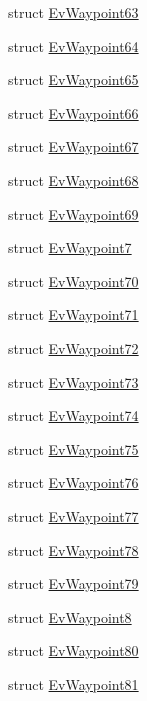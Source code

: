 \begin{DoxyCompactItemize}
\item 
struct \hyperlink{structcl__move__base__z_1_1EvWaypoint63}{Ev\+Waypoint63}
\item 
struct \hyperlink{structcl__move__base__z_1_1EvWaypoint64}{Ev\+Waypoint64}
\item 
struct \hyperlink{structcl__move__base__z_1_1EvWaypoint65}{Ev\+Waypoint65}
\item 
struct \hyperlink{structcl__move__base__z_1_1EvWaypoint66}{Ev\+Waypoint66}
\item 
struct \hyperlink{structcl__move__base__z_1_1EvWaypoint67}{Ev\+Waypoint67}
\item 
struct \hyperlink{structcl__move__base__z_1_1EvWaypoint68}{Ev\+Waypoint68}
\item 
struct \hyperlink{structcl__move__base__z_1_1EvWaypoint69}{Ev\+Waypoint69}
\item 
struct \hyperlink{structcl__move__base__z_1_1EvWaypoint7}{Ev\+Waypoint7}
\item 
struct \hyperlink{structcl__move__base__z_1_1EvWaypoint70}{Ev\+Waypoint70}
\item 
struct \hyperlink{structcl__move__base__z_1_1EvWaypoint71}{Ev\+Waypoint71}
\item 
struct \hyperlink{structcl__move__base__z_1_1EvWaypoint72}{Ev\+Waypoint72}
\item 
struct \hyperlink{structcl__move__base__z_1_1EvWaypoint73}{Ev\+Waypoint73}
\item 
struct \hyperlink{structcl__move__base__z_1_1EvWaypoint74}{Ev\+Waypoint74}
\item 
struct \hyperlink{structcl__move__base__z_1_1EvWaypoint75}{Ev\+Waypoint75}
\item 
struct \hyperlink{structcl__move__base__z_1_1EvWaypoint76}{Ev\+Waypoint76}
\item 
struct \hyperlink{structcl__move__base__z_1_1EvWaypoint77}{Ev\+Waypoint77}
\item 
struct \hyperlink{structcl__move__base__z_1_1EvWaypoint78}{Ev\+Waypoint78}
\item 
struct \hyperlink{structcl__move__base__z_1_1EvWaypoint79}{Ev\+Waypoint79}
\item 
struct \hyperlink{structcl__move__base__z_1_1EvWaypoint8}{Ev\+Waypoint8}
\item 
struct \hyperlink{structcl__move__base__z_1_1EvWaypoint80}{Ev\+Waypoint80}
\item 
struct \hyperlink{structcl__move__base__z_1_1EvWaypoint81}{Ev\+Waypoint81}
\item 

\end{DoxyCompactItemize}
